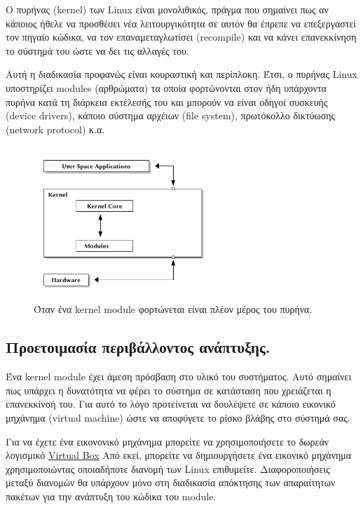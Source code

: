 \documentclass[18pt]{extarticle}
\begin{document}
Ο πυρήνας (kernel) των Linux είναι μονολιθικός, πράγμα που σημαίνει πως αν κάποιος ήθελε να 
προσθέσει νέα λειτουργικότητα σε αυτόν θα έπρεπε να επεξεργαστεί τον πηγαίο κώδικα, 
να τον επαναμεταγλωτίσει (recompile) και να κάνει επανεκκίνηση το σύστημά του ώστε να δει τις αλλαγές του.

Αυτή η διαδικασία προφανώς είναι κουραστική και περίπλοκη. Έτσι, ο πυρήνας Linux 
υποστηρίζει modules (αρθρώματα) τα οποία φορτώνονται στον ήδη υπάρχοντα πυρήνα κατά τη διάρκεια εκτέλεσής του
και μπορούν να είναι οδηγοί συσκευής (device drivers), κάποιο σύστημα αρχέιων (file system), πρωτόκολλο δικτύωσης
(network protocol) κ.α.

\begin{figure}[htpb]
    \centering
    \includegraphics[width=0.6\textwidth]{assets/module.png}
    \caption{Όταν ένα kernel module φορτώνεται είναι πλέον μέρος του πυρήνα.}
    \label{fig:module}
\end{figure}

\subsection{Προετοιμασία περιβάλλοντος ανάπτυξης.}

Ένα kernel module έχει άμεση πρόσβαση στο υλικό του συστήματος.
Αυτό σημαίνει πως υπάρχει η δυνατότητα να φέρει το σύστημα σε κατάσταση που χρειάζεται η επανεκκίνσή του.
Για αυτό το λόγο προτείνεται να δουλέψετε σε κάποιο εικονικό μηχάνημα (virtual machine) ώστε να αποφύγετε το ρίσκο βλάβης στο σύστημά σας.

Για να έχετε ένα εικονονικό μηχάνημα μπορείτε να χρησιμοποιήσετε το δωρεάν λογισμικό \href{https://www.virtualbox.org/}{Virtual Box}
Από εκεί, μπορείτε να δημιουργήσετε ένα εικονικό μηχάνημα χρησιμοποιώντας οποιαδήποτε διανομή των Linux επιθυμείτε.  
Διαφοροποιήσεις μεταξύ διανομών θα υπάρχουν μόνο στη διαδικασία απόκτησης των απαραίτητων πακέτων για την ανάπτυξη του κώδικα του module.
\end{document}
